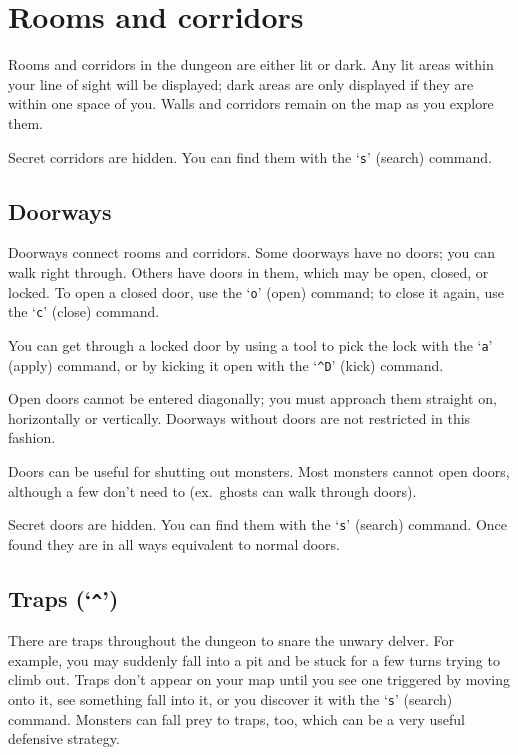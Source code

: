 \section{Rooms and corridors}

Rooms and corridors in the dungeon are either lit or dark.
Any lit areas within your line of sight will be displayed;
dark areas are only displayed if they are within one space of you. 
Walls and corridors remain on the map as you explore them.

Secret corridors are hidden.  You can find them with the `{\tt s}' (search)
command.

\subsection*{Doorways}

Doorways connect rooms and corridors.  Some doorways have no doors;
you can walk right through.  Others have doors in them, which may be
open, closed, or locked.  To open a closed door, use the `{\tt o}' (open)
command; to close it again, use the `{\tt c}' (close) command.

You can get through a locked door by using a tool to pick the lock
with the `{\tt a}' (apply) command, or by kicking it open with the
`{\tt \^{}D}' (kick) command.

Open doors cannot be entered diagonally; you must approach them
straight on, horizontally or vertically.  Doorways without doors are
not restricted in this fashion.

Doors can be useful for shutting out monsters.  Most monsters cannot
open doors, although a few don't need to (ex.\ ghosts can walk through
doors).

Secret doors are hidden.  You can find them with the `{\tt s}' (search)
command.  Once found they are in all ways equivalent to normal doors.

\subsection*{Traps (`{\tt \^{}}')}

There are traps throughout the dungeon to snare the unwary delver.
For example, you may suddenly fall into a pit and be stuck for a few
turns trying to climb out.  Traps don't appear on your map until you
see one triggered by moving onto it, see something fall into it, or you
discover it with the `{\tt s}' (search) command.  Monsters can fall prey to
traps, too, which can be a very useful defensive strategy.


